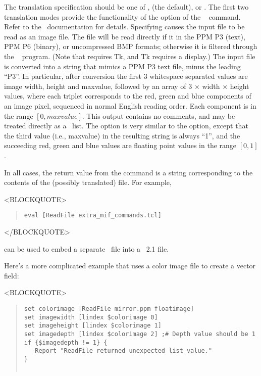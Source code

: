 \begin{description}
The translation specification should be one of , 
(the default),  or .  The
first two translation modes provide the functionality of the
 option of the \Tcl\  command.  Refer to
the \Tcl\ documentation for details.  Specifying  causes the
input file to be read as an image file.  The file will be read
directly if it in the PPM P3 (text), PPM P6 (binary), or uncompressed
BMP formats; otherwise it is filtered through the \OOMMF\
program.  (Note that \app{any2ppm} requires Tk, and Tk requires a
display.)  The input file is converted into a string that mimics a PPM
P3 text file, minus the leading ``P3''.  In particular, after conversion
the first 3 whitespace separated values are image width, height and
maxvalue, followed by an array of 3 $\times$ width $\times$ height
values, where each triplet corresponds to the red, green and blue
components of an image pixel, sequenced in normal English reading order.
Each component is in the range $[0,maxvalue]$.  This output contains no
comments, and may be treated directly as a \Tcl\ list.  The
 option is very similar to the  option, except
that the third value (i.e., maxvalue) in the resulting string is always
``1'', and the succeeding red, green and blue values are floating point
values in the range $[0,1]$.

In all cases, the return value from the  command is a
string corresponding to the contents of the (possibly translated) file.
For example,
\begin{rawhtml}
<BLOCKQUOTE>
\end{rawhtml}
\begin{quote}
\begin{verbatim}
eval [ReadFile extra_mif_commands.tcl]
\end{verbatim}
\end{quote}
\begin{rawhtml}
</BLOCKQUOTE>
\end{rawhtml}
can be used to embed a separate \Tcl\ file into a \MIF~2.1 file.

%
Here's a more complicated example that uses a color image file to
create a vector field:
\begin{rawhtml}
<BLOCKQUOTE>
\end{rawhtml}
\begin{quote}
\begin{verbatim}
set colorimage [ReadFile mirror.ppm floatimage]
set imagewidth [lindex $colorimage 0]
set imageheight [lindex $colorimage 1]
set imagedepth [lindex $colorimage 2] ;# Depth value should be 1
if {$imagedepth != 1} {
   Report "ReadFile returned unexpected list value."
}


\end{verbatim}
\end{quote}
\end{description}
